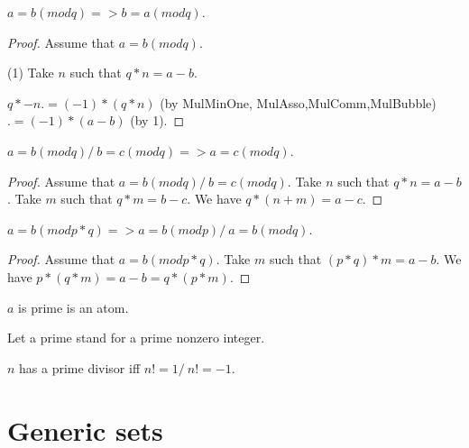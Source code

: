 \documentclass{document}
\begin{document}
\begin{forthel}
    \begin{lemma}[EquModSym]
      $a = b (mod q) => b = a (mod q)$.
    \end{lemma}
    \begin{proof}
      Assume that $a = b (mod q)$.

      (1) Take $n$ such that $q * n = a - b$.

      $q * -n .= (-1) * (q * n)$ (by MulMinOne, MulAsso,MulComm,MulBubble) $.= (-1) * (a - b)$ (by 1).
    \end{proof}

    \begin{lemma}[EquModTrn]
      $a = b (mod q) /\ b = c (mod q) => a = c (mod q)$.
    \end{lemma}
    \begin{proof}
      Assume that $a = b (mod q) /\ b = c (mod q)$. Take $n$ such that $q * n = a - b$. Take $m$ such that $q * m = b - c$. We have $q * (n + m) = a - c$.
    \end{proof}

    \begin{lemma}[EquModMul]
      $a = b (mod p * q) => a = b (mod p) /\ a = b (mod q)$.
    \end{lemma}
    \begin{proof}
      Assume that $a = b (mod p * q)$. Take $m$ such that $(p * q) * m = a - b$. We have $p * (q * m) = a - b = q * (p * m)$.
    \end{proof}

    \begin{signature}[Prime]
      $a$ is prime is an atom.
    \end{signature}

    Let a prime stand for a prime nonzero integer.

    \begin{axiom}[PrimeDivisor]
      $n$ has a prime divisor iff $n != 1 /\ n != -1$.
    \end{axiom}
  \end{forthel}


  \section{Generic sets}
\end{document}
